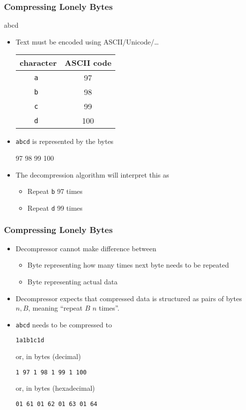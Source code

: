 \documentclass{../ucll-slides}
\begin{document}
\begin{frame}
  \frametitle{Compressing Lonely Bytes}
  \begin{center}
    abcd
  \end{center}
  \begin{itemize}
    \item Text must be encoded using ASCII/Unicode/\dots
          \begin{center} \small
            \begin{tabular}{cc}
              \textbf{character} & \textbf{ASCII code} \\
              \toprule
              \tt a & 97 \\
              \tt b & 98 \\
              \tt c & 99 \\
              \tt d & 100 \\
            \end{tabular}
          \end{center}
    \item {\tt abcd} is represented by the bytes
          \begin{center}
            97 98 99 100
          \end{center}
    \item The decompression algorithm will interpret this as
          \begin{itemize}
            \item Repeat \texttt{b} 97 times
            \item Repeat \texttt{d} 99 times
          \end{itemize}
  \end{itemize}
\end{frame}

\begin{frame}
  \frametitle{Compressing Lonely Bytes}
  \begin{itemize}
    \item Decompressor cannot make difference between
          \begin{itemize}
            \item Byte representing how many times next byte needs to be repeated
            \item Byte representing actual data
          \end{itemize}
    \item Decompressor expects that compressed data
          is structured as pairs of bytes $n,B$, meaning
          ``repeat $B$ $n$ times''.
    \item \texttt{abcd} needs to be compressed to
          \begin{center}
            \tt 1a1b1c1d
          \end{center}
          or, in bytes (decimal)
          \begin{center}
            \tt 1 97 1 98 1 99 1 100 
          \end{center}
          or, in bytes (hexadecimal)
          \begin{center}
            \tt 01 61 01 62 01 63 01 64 
          \end{center}
  \end{itemize}
\end{frame}
\end{document}
